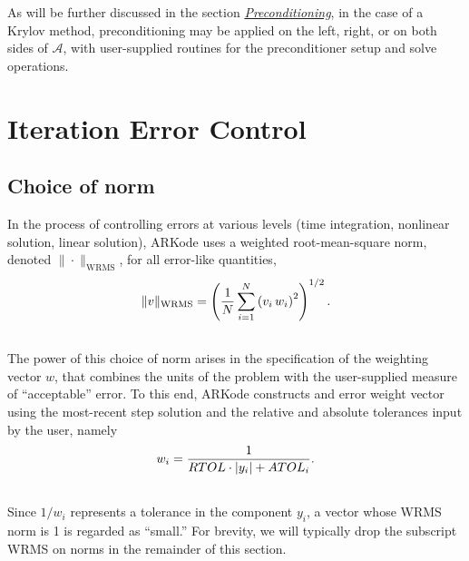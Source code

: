 \documentclass[letterpaper,10pt,english]{sphinxmanual}
\begin{document}
As will be further discussed in the section
{\hyperref[Mathematics:mathematics-preconditioning]{\emph{Preconditioning}}}, in the case of a Krylov method,
preconditioning may be applied on the left, right, or on both sides of
${\mathcal A}$, with user-supplied routines for the preconditioner setup
and solve operations.


\section{Iteration Error Control}
\label{Mathematics:mathematics-error}\label{Mathematics:iteration-error-control}

\subsection{Choice of norm}
\label{Mathematics:choice-of-norm}\label{Mathematics:mathematics-error-norm}
In the process of controlling errors at various levels (time
integration, nonlinear solution, linear solution), ARKode uses a
weighted root-mean-square norm, denoted
$\|\cdot\|_\text{WRMS}$, for all error-like quantities,
\label{Mathematics:equation-WRMS_NORM}\begin{gather}
\begin{split}\|v\|_\text{WRMS} = \left( \frac{1}{N} \sum_{i=1}^N \left(v_i\,
w_i\right)^2\right)^{1/2}.\end{split}\label{Mathematics-WRMS_NORM}\\\begin{split}\end{split}\notag
\end{gather}
The power of this choice of norm arises in the specification of the
weighting vector $w$, that combines the units of the problem
with the user-supplied measure of ``acceptable'' error.  To this end,
ARKode constructs and error weight vector using the
most-recent step solution and the relative and absolute tolerances
input by the user, namely
\label{Mathematics:equation-EWT}\begin{gather}
\begin{split}w_i = \frac{1}{RTOL\cdot |y_i| + ATOL_i}.\end{split}\label{Mathematics-EWT}\\\begin{split}\end{split}\notag
\end{gather}
Since $1/w_i$ represents a tolerance in the component
$y_i$, a vector whose WRMS norm is 1 is regarded as ``small.'' For
brevity, we will typically drop the subscript WRMS on norms in the
remainder of this section.
\end{document}
